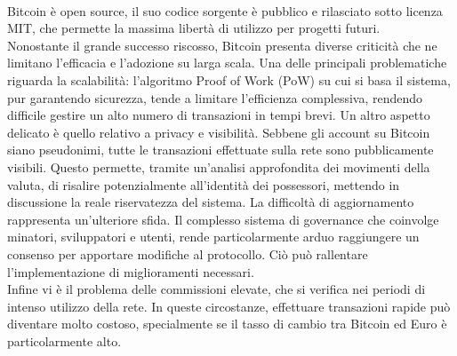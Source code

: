 \\
Bitcoin è open source, il suo codice sorgente è pubblico e rilasciato sotto licenza MIT, che permette la massima libertà di utilizzo per progetti futuri.
\\Nonostante il grande successo riscosso, Bitcoin presenta diverse criticità che ne limitano l'efficacia e l'adozione su larga scala. Una delle principali problematiche riguarda la scalabilità: l'algoritmo Proof of Work (PoW) su cui si basa il sistema, pur garantendo sicurezza, tende a limitare l'efficienza complessiva, rendendo difficile gestire un alto numero di transazioni in tempi brevi.
Un altro aspetto delicato è quello relativo a privacy e visibilità. Sebbene gli account su Bitcoin siano pseudonimi, tutte le transazioni effettuate sulla rete sono pubblicamente visibili. Questo permette, tramite un'analisi approfondita dei movimenti della valuta, di risalire potenzialmente all'identità dei possessori, mettendo in discussione la reale riservatezza del sistema.
La difficoltà di aggiornamento rappresenta un'ulteriore sfida. Il complesso sistema di governance che coinvolge minatori, sviluppatori e utenti, rende particolarmente arduo raggiungere un consenso per apportare modifiche al protocollo. Ciò può rallentare l'implementazione di miglioramenti necessari.
\\Infine vi è il problema delle commissioni elevate, che si verifica nei periodi di intenso utilizzo della rete. In queste circostanze, effettuare transazioni rapide può diventare molto costoso, specialmente se il tasso di cambio tra Bitcoin ed Euro è particolarmente alto.

\newpage
